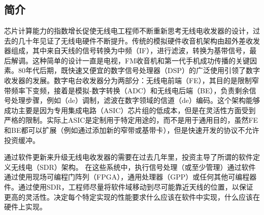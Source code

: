 \chapter{}
\section{简介}
\par 芯片计算能力的指数增长促使无线电工程师不断重新思考无线电收发器的设计，过去的几十年见证了无线电硬件不断提升。传统的模拟硬件收音机架构由超外差收发器组成，其中来自天线的信号转换为中频（IF），进行滤波，转换为基带信号，最后解调。这种简单的设计一直是电视，FM收音机和第一代手机成功传播的关键因素。80年代后期，既快速又便宜的数字信号处理器（DSP）的广泛使用引领了数字收发器的发展。数字电台收发器分为两部分：无线电前端（FE），其目的是限制窄带频率下变频，接着是模拟-数字转换（ADC）和无线电后端（BE），负责剩余信号处理步骤，例如（de）调制，滤波在数字领域的信道（de）编码。这个架构能够成功主要是因为专用集成电路（ASIC）芯片组的低成本，但是在灵活性方面受到严格的限制。实际上ASIC是定制用于特定用途的，而不是用于通用目的，虽然FE和BE都可以扩展（例如通过添加新的窄带或基带卡），但是快速开发的协议不允许投资缓冲。
\par 通过软件更新来升级无线电收发器的需要在过去几年里，投资主导了所谓的软件定义无线电（SDR）架构。 在这些系统中，执行信号处理（或至少管理）通过软件通过使用现场可编程门阵列（FPGA），通用处理器（GPP）或任何其他可编程器件。通过使用SDR，工程师尽量将软件域移动到尽可能靠近天线的位置，以保证更高的灵活性。决定每个特定实现的性能要求什么应该在软件中实现，什么应该在硬件上实现。
